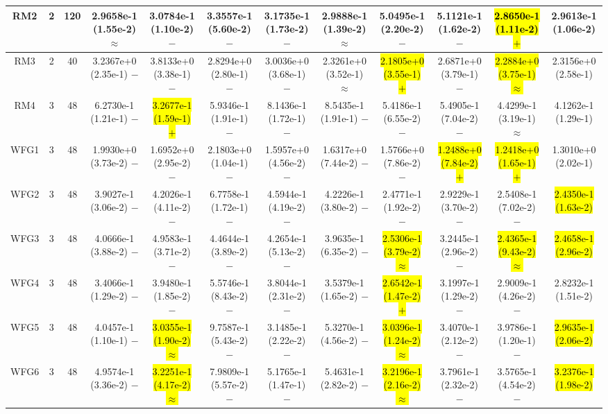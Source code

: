 \documentclass[journal]{IEEEtran}
\begin{document}
\begin{table*}[htbp]
\begin{tabular}{cccccccccccc}
\hline
\multirow{1}{*}{RM2}&2&120&2.9658e-1 (1.55e-2) $\approx$&3.0784e-1 (1.10e-2) $-$&3.3557e-1 (5.60e-2) $-$&3.1735e-1 (1.73e-2) $-$&2.9888e-1 (1.39e-2) $\approx$&5.0495e-1 (2.20e-2) $-$&5.1121e-1 (1.62e-2) $-$&\hl{2.8650e-1 (1.11e-2) $+$}&2.9613e-1 (1.06e-2)\\
\hline
\multirow{1}{*}{RM3}&2&40&3.2367e+0 (2.35e-1) $-$&3.8133e+0 (3.38e-1) $-$&2.8294e+0 (2.80e-1) $-$&3.0036e+0 (3.68e-1) $-$&2.3261e+0 (3.52e-1) $\approx$&\hl{2.1805e+0 (3.55e-1) $+$}&2.6871e+0 (3.79e-1) $-$&\hl{2.2884e+0 (3.75e-1) $\approx$}&2.3156e+0 (2.58e-1)\\
\hline
\multirow{1}{*}{RM4}&3&48&6.2730e-1 (1.21e-1) $-$&\hl{3.2677e-1 (1.59e-1) $+$}&5.9346e-1 (1.91e-1) $-$&8.1436e-1 (1.72e-1) $-$&8.5435e-1 (1.91e-1) $-$&5.4186e-1 (6.55e-2) $-$&5.4905e-1 (7.04e-2) $-$&4.4299e-1 (3.19e-1) $\approx$&4.1262e-1 (1.29e-1)\\
\hline
\multirow{1}{*}{WFG1}&3&48&1.9930e+0 (3.73e-2) $-$&1.6952e+0 (2.95e-2) $-$&2.1803e+0 (1.04e-1) $-$&1.5957e+0 (4.56e-2) $-$&1.6317e+0 (7.44e-2) $-$&1.5766e+0 (7.86e-2) $-$&\hl{1.2488e+0 (7.84e-2) $+$}&\hl{1.2418e+0 (1.65e-1) $+$}&1.3010e+0 (2.02e-1)\\
\hline
\multirow{1}{*}{WFG2}&3&48&3.9027e-1 (3.06e-2) $-$&4.2026e-1 (4.11e-2) $-$&6.7758e-1 (1.72e-1) $-$&4.5944e-1 (4.19e-2) $-$&4.2226e-1 (3.80e-2) $-$&2.4771e-1 (1.92e-2) $-$&2.9229e-1 (3.70e-2) $-$&2.5408e-1 (7.02e-2) $-$&\hl{2.4350e-1 (1.63e-2)}\\
\hline
\multirow{1}{*}{WFG3}&3&48&4.0666e-1 (3.88e-2) $-$&4.9583e-1 (3.71e-2) $-$&4.4644e-1 (3.89e-2) $-$&4.2654e-1 (5.13e-2) $-$&3.9635e-1 (6.35e-2) $-$&\hl{2.5306e-1 (3.79e-2) $\approx$}&3.2445e-1 (2.96e-2) $-$&\hl{2.4365e-1 (9.43e-2) $\approx$}&\hl{2.4658e-1 (2.96e-2)}\\
\hline
\multirow{1}{*}{WFG4}&3&48&3.4066e-1 (1.29e-2) $-$&3.9480e-1 (1.85e-2) $-$&5.5746e-1 (8.43e-2) $-$&3.8044e-1 (2.31e-2) $-$&3.5379e-1 (1.65e-2) $-$&\hl{2.6542e-1 (1.47e-2) $+$}&3.1997e-1 (1.29e-2) $-$&2.9009e-1 (4.26e-2) $-$&2.8232e-1 (1.51e-2)\\
\hline
\multirow{1}{*}{WFG5}&3&48&4.0457e-1 (1.10e-1) $-$&\hl{3.0355e-1 (1.90e-2) $\approx$}&9.7587e-1 (5.43e-2) $-$&3.1485e-1 (2.22e-2) $-$&5.3270e-1 (4.56e-2) $-$&\hl{3.0396e-1 (1.24e-2) $\approx$}&3.4070e-1 (2.12e-2) $-$&3.9786e-1 (1.20e-1) $-$&\hl{2.9635e-1 (2.06e-2)}\\
\hline
\multirow{1}{*}{WFG6}&3&48&4.9574e-1 (3.36e-2) $-$&\hl{3.2251e-1 (4.17e-2) $\approx$}&7.9809e-1 (5.57e-2) $-$&5.1765e-1 (1.47e-1) $-$&5.4631e-1 (2.82e-2) $-$&\hl{3.2196e-1 (2.16e-2) $\approx$}&3.7961e-1 (2.32e-2) $-$&3.5765e-1 (4.54e-2) $-$&\hl{3.2376e-1 (1.98e-2)}\\

\end{tabular}
\end{table*}
\end{document}

